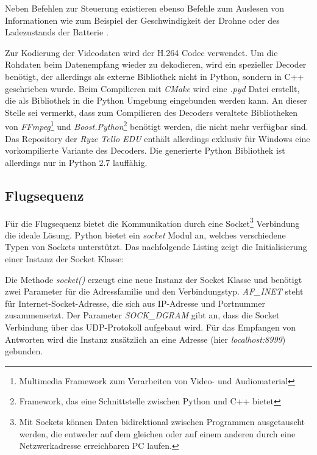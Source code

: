 Neben Befehlen zur Steuerung existieren ebenso Befehle zum Auslesen von Informationen wie zum Beispiel der Geschwindigkeit der Drohne oder des Ladezustands der Batterie \cite{RyzeTech.2018}. 

Zur Kodierung der Videodaten wird der H.264 Codec verwendet. Um die Rohdaten beim Datenempfang wieder zu dekodieren, wird ein spezieller Decoder benötigt, der allerdings als externe Bibliothek nicht in Python, sondern in C++ geschrieben wurde. Beim Compilieren mit \textit{CMake} wird eine \textit{.pyd} Datei erstellt, die als Bibliothek in die Python Umgebung eingebunden werden kann. An dieser Stelle sei vermerkt, dass zum Compilieren des Decoders veraltete Bibliotheken von \textit{FFmpeg}\footnote{Multimedia Framework zum Verarbeiten von Video- und Audiomaterial} und \textit{Boost.Python}\footnote{Framework, das eine Schnittstelle zwischen Python und C++ bietet} benötigt werden, die nicht mehr verfügbar sind. Das Repository der \textit{Ryze Tello EDU} enthält allerdings exklusiv für Windows eine vorkompilierte Variante des Decoders. Die generierte Python Bibliothek ist allerdings nur in Python 2.7 lauffähig.

\subsection*{Flugsequenz}

Für die Flugsequenz bietet die Kommunikation durch eine Socket\footnote{Mit Sockets können Daten bidirektional zwischen  Programmen ausgetauscht werden, die entweder auf dem gleichen oder auf einem anderen durch eine Netzwerkadresse erreichbaren PC laufen.} Verbindung die ideale Lösung. Python bietet ein \textit{socket} Modul an, welches verschiedene Typen von Sockets unterstützt. Das nachfolgende Listing zeigt die Initialisierung einer Instanz der Socket Klasse:



Die Methode \textit{socket()} erzeugt eine neue Instanz der Socket Klasse und benötigt zwei Parameter für die Adressfamilie und den Verbindungstyp. \textit{AF\_INET} steht für Internet-Socket-Adresse, die sich aus IP-Adresse und Portnummer zusammensetzt. Der Parameter \textit{SOCK\_DGRAM} gibt an, dass die Socket Verbindung über das UDP-Protokoll aufgebaut wird. Für das Empfangen von Antworten wird die Instanz zusätzlich an eine Adresse (hier \textit{localhost:8999}) gebunden. 

